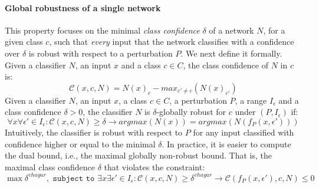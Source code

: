 \documentclass[11pt]{article}
\begin{document}
\paragraph{Global robustness of a single network}
This property focuses on the minimal \emph{class confidence} $\delta$ of a network $N$, for a given class $c$, such that \emph{every} input that the network classifies with a confidence over $\delta$ is robust with respect to a perturbation $P$. We next define it formally.
Given a classifier $N$, an input $x$ and a class $c\in{C}$, the class confidence of $N$ in $c$ is:
$$\mathcal{C}(x,c,N)=N(x)_{c}-max_{c'\ne c}(N(x)_{c'})$$
Given a classifier $N$, an input $x$, a class $c\in{C}$, a perturbation $P$, a range $I_\epsilon$ and a class confidence $\delta>0$, the classifier $N$ is $\delta$-globally robust for $c$ under $(P,I_\epsilon)$ if:\\
$$\forall{x}\forall{\epsilon'}\in{I_\epsilon}:    \mathcal{C}(x,c,N) \geq \delta \rightarrow argmax(N(x)) = argmax(N(f_P(x,\epsilon'))) $$
Intuitively, the classifier is robust with respect to $P$ for any input classified with confidence higher or equal to the minimal $\delta$. In practice, it is easier to compute the dual bound, i.e., the maximal globally non-robust bound. That is, the maximal class confidence $\delta$ that violates the constraint:
$$\max{\delta^{vhagar}}, \texttt{ subject to } \exists{x}\exists{\epsilon'}\in{I_\epsilon}: \mathcal{C}(x,c,N) \geq \delta^{vhagar} \rightarrow \mathcal{C}(f_P(x,\epsilon'),c,N)\leq 0$$ 
\end{document}

